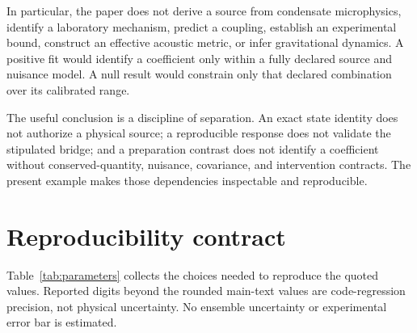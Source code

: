 \documentclass[aps,prd,twocolumn,superscriptaddress,nofootinbib,floatfix]{revtex4-2}
\begin{document}
In particular, the paper does not derive a source from condensate microphysics, identify a laboratory mechanism, predict a coupling, establish an experimental bound, construct an effective acoustic metric, or infer gravitational dynamics. A positive fit would identify a coefficient only within a fully declared source and nuisance model. A null result would constrain only that declared combination over its calibrated range.

The useful conclusion is a discipline of separation. An exact state identity does not authorize a physical source; a reproducible response does not validate the stipulated bridge; and a preparation contrast does not identify a coefficient without conserved-quantity, nuisance, covariance, and intervention contracts. The present example makes those dependencies inspectable and reproducible.

\appendix

\section{Reproducibility contract}
\label{app:reproducibility}

Table~\ref{tab:parameters} collects the choices needed to reproduce the quoted values. Reported digits beyond the rounded main-text values are code-regression precision, not physical uncertainty. No ensemble uncertainty or experimental error bar is estimated.
\end{document}
